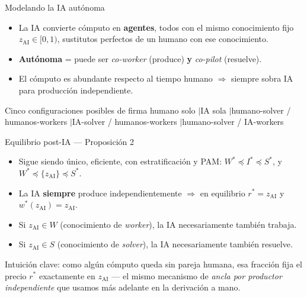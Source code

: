 \documentclass[aspectratio=169]{beamer}
\newcommand{\zAI}{z_{\mathrm{AI}}}
\begin{document}
\begin{frame}{Modelando la IA autónoma}
\begin{itemize}
  \item La IA convierte cómputo en \textbf{agentes}, todos con el mismo conocimiento fijo $\zAI\in[0,1)$, sustitutos perfectos de un humano con ese conocimiento.
  \item \textbf{Autónoma} = puede ser \emph{co-worker} (produce) \textbf{y} \emph{co-pilot} (resuelve).
  \item El cómputo es abundante respecto al tiempo humano $\Rightarrow$ siempre sobra IA para producción independiente.
\end{itemize}
\begin{block}{Cinco configuraciones posibles de firma}
\footnotesize humano solo \quad$\vert$\quad IA sola \quad$\vert$\quad humano-solver / humanos-workers \quad$\vert$\quad IA-solver / humanos-workers \quad$\vert$\quad humano-solver / IA-workers
\end{block}
\end{frame}

\begin{frame}{Equilibrio post-IA --- Proposición 2}
\begin{itemize}
  \item Sigue siendo único, eficiente, con estratificación y PAM: $W^*\preceq I^*\preceq S^*$, y $W^*\preceq\{\zAI\}\preceq S^*$.
  \item La IA \textbf{siempre} produce independientemente $\Rightarrow$ en equilibrio $r^*=\zAI$ y $w^*(\zAI)=\zAI$.
  \item Si $\zAI\in W$ (conocimiento de \emph{worker}), la IA necesariamente también trabaja.
  \item Si $\zAI\in S$ (conocimiento de \emph{solver}), la IA necesariamente también resuelve.
\end{itemize}
\vspace{0.2cm}
\alert{Intuición clave:} como algún cómputo queda sin pareja humana, esa fracción fija el precio $r^*$ exactamente en $\zAI$ --- el mismo mecanismo de \emph{ancla por productor independiente} que usamos más adelante en la derivación a mano.
\end{frame}
\end{document}
